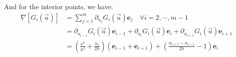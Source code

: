 \documentclass[]{article}
\begin{document}
    And for the interior points, we have: 
    \begin{align*}\tag{4.3}\label{eqn:4.3}
        \nabla[G_i(\vec{u})] &= 
        \sum_{j = 1}^{m}\partial_{u_j}G_i(\vec{u})\mathbf{e}_j \quad \forall i = 2, \cdots, m - 1
        \\
        &= 
        \partial_{u_{i - 1}}G_i(\vec{u})\mathbf{e}_{i - 1} + 
        \partial_{u_{i}}G_i(\vec{u})\mathbf{e}_{i} + 
        \partial_{u_{i + 1}}G_i(\vec{u})\mathbf{e}_{i + 1}
        \\
        &= 
        \left(
            \frac{\epsilon^2}{h^2} + \frac{u_i}{2h}
        \right)(\mathbf{e}_{i - 1} + \mathbf{e}_{i + 1}) + 
        \left(
            \frac{u_{i + 1} - u_{i - 1}}{2h} - 1
        \right)\mathbf{e}_{i}
    \end{align*}
    
\end{document}
